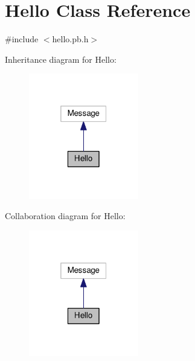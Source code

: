 \hypertarget{class_hello}{}\section{Hello Class Reference}
\label{class_hello}


{\ttfamily \#include $<$hello.\+pb.\+h$>$}



Inheritance diagram for Hello\+:\nopagebreak
\begin{figure}[H]
\begin{center}
\leavevmode
\includegraphics[width=136pt]{class_hello__inherit__graph}
\end{center}
\end{figure}


Collaboration diagram for Hello\+:\nopagebreak
\begin{figure}[H]
\begin{center}
\leavevmode
\includegraphics[width=136pt]{class_hello__coll__graph}
\end{center}
\end{figure}
